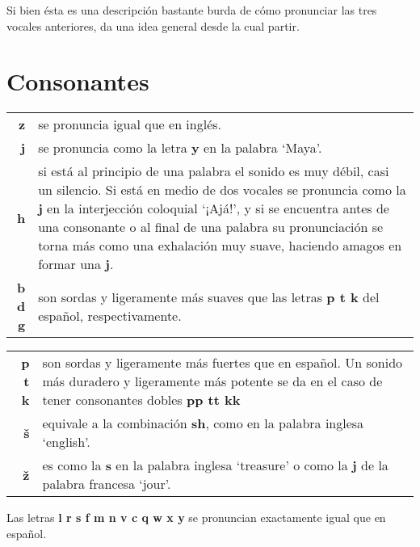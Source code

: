 \begin{enumerate}
	Si bien ésta es una descripción bastante burda de cómo pronunciar las tres vocales anteriores, da una idea general desde la cual partir.

 	\section*{\Large{Consonantes}}

 	\begin{tabular}{ r p{9.65cm} }

 	\textbf{z} & se pronuncia igual que en inglés.\\[0.5cm]

 	\textbf{j} & se pronuncia como la letra \textbf{y} en la palabra `Maya'.\\[0.5cm] 

 	\textbf{h} & si está al principio de una palabra el sonido es muy débil, casi un silencio. Si está en medio de dos vocales se pronuncia como la \textbf{j} en la interjección coloquial `¡Ajá!', y si se encuentra antes de una consonante o al final de una palabra su pronunciación se torna más como una exhalación muy suave, haciendo amagos en formar una \textbf{j}.\\[0.5cm]

 	\textbf{b d g} & son sordas y ligeramente más suaves que las letras \textbf{p t k} del español, respectivamente.\\[0.5cm]

 	
 	\end{tabular}
 	\newpage 
 	\begin{tabular}{ r p{9.65cm} }

 	\textbf{p t k} & son sordas y ligeramente más fuertes que en español. Un sonido más duradero y ligeramente más potente se da en el caso de tener consonantes dobles \textbf{pp tt kk}\\[0.5cm]  

 	\textbf{š} & equivale a la combinación \textbf{sh}, como en la palabra inglesa `english'.\\[0.5cm]

 	\textbf{ž} & es como la \textbf{s} en la palabra inglesa `treasure' o como la \textbf{j} de la palabra francesa `jour'.

 	\end{tabular}

 	Las letras \textbf{l r s f m n v c q w x y} se pronuncian exactamente igual que en español.\\


\end{enumerate}
